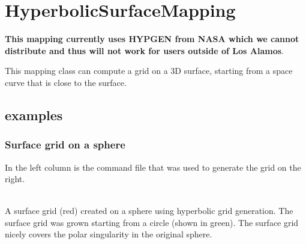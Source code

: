 \section{HyperbolicSurfaceMapping}

{\bf This mapping currently uses HYPGEN from NASA which we cannot distribute and thus
   will not work for users outside of Los Alamos}.

This mapping class can compute a grid on a 3D surface, starting from a space
curve that is close to the surface.



\subsection{examples}

\subsubsection{Surface grid on a sphere}
In the left column is the command file that was used to generate the grid on the right.

\noindent
\begin{minipage}{.4\linewidth}
{\footnotesize
{}
}
\end{minipage}\hfill
\begin{minipage}{.6\linewidth}
  \begin{center}
     \\
  {A surface grid (red) created on a sphere using hyperbolic grid generation. The surface grid
    was grown starting from a circle (shown in green). The surface
    grid nicely covers the polar singularity in the original sphere.}
  \end{center}
\end{minipage}

% 





